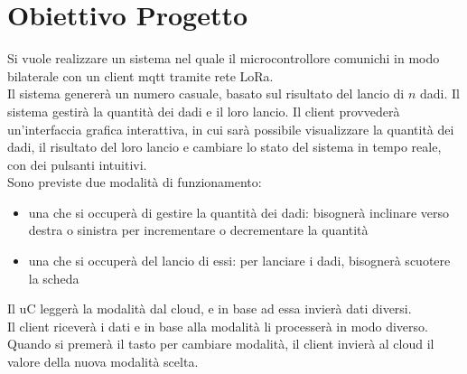 \section{Obiettivo Progetto}
Si vuole realizzare un sistema nel quale il microcontrollore comunichi in modo bilaterale con un client mqtt tramite rete LoRa.
\\Il sistema genererà un numero casuale, basato sul risultato del lancio di $n$ dadi. Il sistema gestirà la quantità dei dadi e il loro lancio. Il client provvederà un'interfaccia grafica interattiva, in cui sarà possibile visualizzare la quantità dei dadi, il risultato del loro lancio
e cambiare lo stato del sistema in tempo reale, con dei pulsanti intuitivi.
\\Sono previste due modalità di funzionamento:
\begin{itemize}
  \item una che si occuperà di gestire la quantità dei dadi: bisognerà inclinare verso destra o sinistra per incrementare o decrementare la quantità
  \item una che si occuperà del lancio di essi: per lanciare i dadi, bisognerà scuotere la scheda
\end{itemize}
Il uC leggerà la modalità dal cloud, e in base ad essa invierà dati diversi.
\\Il client riceverà i dati e in base alla modalità li processerà in modo diverso. Quando si premerà il tasto per cambiare modalità, il client invierà al cloud il valore della nuova modalità scelta.





